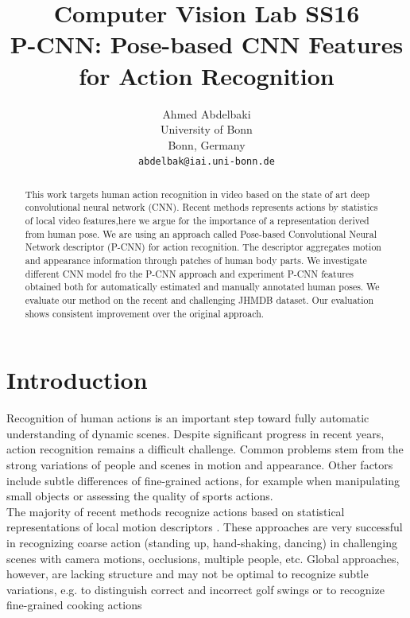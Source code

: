 \documentclass[10pt,twocolumn,letterpaper]{article}
\begin{document}
\title{ Computer Vision Lab SS16\\ P-CNN: Pose-based CNN Features for Action Recognition}

\author{Ahmed Abdelbaki\\
University of Bonn\\
Bonn, Germany\\
{\tt\small abdelbak@iai.uni-bonn.de}
}

\maketitle

\begin{abstract}
   This work targets human action recognition in video based on the state of art deep convolutional neural network (CNN). Recent methods represents actions by statistics of local video features,here we argue for the importance of a representation derived from human pose. We are using an approach called Pose-based Convolutional Neural Network descriptor (P-CNN) for action recognition. The descriptor aggregates motion and appearance information through patches of human body parts. We investigate different CNN model fro the P-CNN approach and experiment P-CNN features obtained  both for automatically estimated and manually annotated human poses. We evaluate our method on the recent and challenging JHMDB dataset. Our evaluation shows consistent improvement over the original approach.
   
\end{abstract}

\section{Introduction}

Recognition of human actions is an important step toward
fully automatic understanding of dynamic scenes. Despite
significant progress in recent years, action recognition
remains a difficult challenge. Common problems stem from
the strong variations of people and scenes in motion and appearance.
Other factors include subtle differences of fine-grained
actions, for example when manipulating small objects
or assessing the quality of sports actions.\\

The majority of recent methods recognize actions based
on statistical representations of local motion descriptors
\cite{schuldt2004recognizing,laptev2008learning,wang2013action}. These approaches are very successful
in recognizing coarse action (standing up, hand-shaking,
dancing) in challenging scenes with camera motions, occlusions,
multiple people, etc. Global approaches, however,
are lacking structure and may not be optimal to recognize
subtle variations, e.g. to distinguish correct and incorrect
golf swings or to recognize fine-grained cooking actions 
\end{document}

